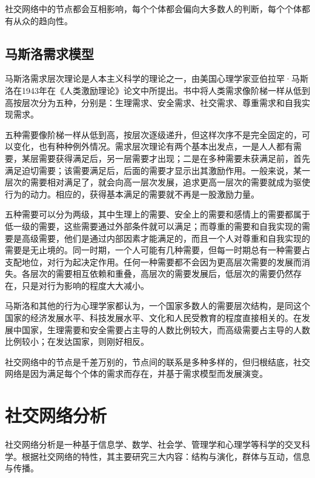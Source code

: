 \documentclass[12pt]{report}
\begin{document}
			社交网络中的节点都会互相影响，每个个体都会偏向大多数人的判断，每个个体都有从众的趋向性。
			
		\subsection{马斯洛需求模型}
		
			马斯洛需求层次理论是人本主义科学的理论之一，由美国心理学家亚伯拉罕·马斯洛在1943年在《人类激励理论》论文中所提出。书中将人类需求像阶梯一样从低到高按层次分为五种，分别是：生理需求、安全需求、社交需求、尊重需求和自我实现需求。
			
			五种需要像阶梯一样从低到高，按层次逐级递升，但这样次序不是完全固定的，可以变化，也有种种例外情况。需求层次理论有两个基本出发点，一是人人都有需要，某层需要获得满足后，另一层需要才出现；二是在多种需要未获满足前，首先满足迫切需要；该需要满足后，后面的需要才显示出其激励作用。一般来说，某一层次的需要相对满足了，就会向高一层次发展，追求更高一层次的需要就成为驱使行为的动力。相应的，获得基本满足的需要就不再是一股激励力量。
			
			五种需要可以分为两级，其中生理上的需要、安全上的需要和感情上的需要都属于低一级的需要，这些需要通过外部条件就可以满足；而尊重的需要和自我实现的需要是高级需要，他们是通过内部因素才能满足的，而且一个人对尊重和自我实现的需要是无止境的。同一时期，一个人可能有几种需要，但每一时期总有一种需要占支配地位，对行为起决定作用。任何一种需要都不会因为更高层次需要的发展而消失。各层次的需要相互依赖和重叠，高层次的需要发展后，低层次的需要仍然存在，只是对行为影响的程度大大减小。
			
			马斯洛和其他的行为心理学家都认为，一个国家多数人的需要层次结构，是同这个国家的经济发展水平、科技发展水平、文化和人民受教育的程度直接相关的。在发展中国家，生理需要和安全需要占主导的人数比例较大，而高级需要占主导的人数比例较小；在发达国家，则刚好相反。
			
			社交网络中的节点是千差万别的，节点间的联系是多种多样的，但归根结底，社交网络是因为满足每个个体的需求而存在，并基于需求模型而发展演变。
			
	\section{社交网络分析}
			
		社交网络分析是一种基于信息学、数学、社会学、管理学和心理学等科学的交叉科学。根据社交网络的特性，其主要研究三大内容：结构与演化，群体与互动，信息与传播。
		
\end{document}
